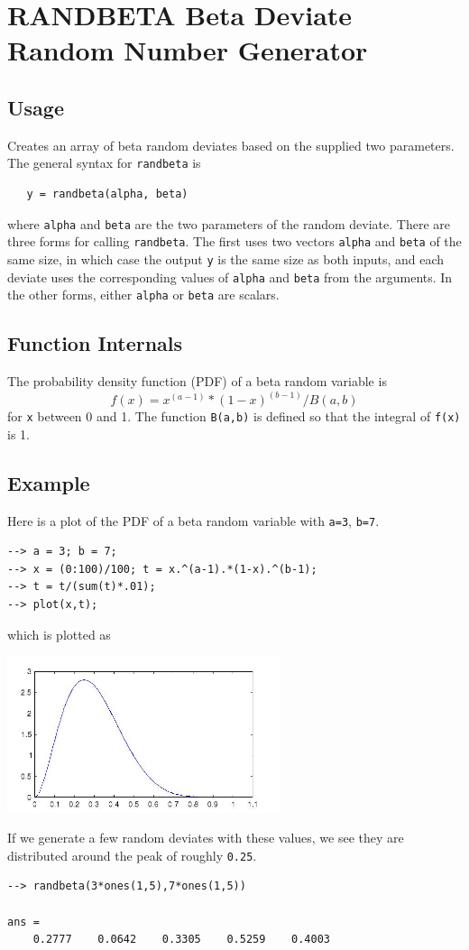 \section{RANDBETA Beta Deviate Random Number Generator}

\subsection{Usage}

Creates an array of beta random deviates based on the supplied
two parameters. The general syntax for \verb|randbeta| is 
\begin{verbatim}
   y = randbeta(alpha, beta)
\end{verbatim}
where \verb|alpha| and \verb|beta| are the two parameters of the 
random deviate.  There are three forms for calling \verb|randbeta|.
The first uses two vectors \verb|alpha| and \verb|beta| of the same
size, in which case the output \verb|y| is the same size as both
inputs, and each deviate uses the corresponding values of \verb|alpha|
and \verb|beta| from the arguments.  In the other forms, either
\verb|alpha| or \verb|beta| are scalars.
\subsection{Function Internals}

The probability density function (PDF) of a beta random variable
is
\[
f(x) = x^(a-1) * (1-x)^(b-1) / B(a,b)
\]
for \verb|x| between 0 and 1.  The function \verb|B(a,b)| is defined so
that the integral of \verb|f(x)| is 1.
\subsection{Example}

Here is a plot of the PDF of a beta random variable with \verb|a=3|,
\verb|b=7|.
\begin{verbatim}
--> a = 3; b = 7;
--> x = (0:100)/100; t = x.^(a-1).*(1-x).^(b-1); 
--> t = t/(sum(t)*.01);
--> plot(x,t);
\end{verbatim}
which is plotted as


\centerline{\includegraphics[width=8cm]{betapdf}}

If we generate a few random deviates with these values,
we see they are distributed around the peak of roughly
\verb|0.25|.
\begin{verbatim}
--> randbeta(3*ones(1,5),7*ones(1,5))

ans = 
    0.2777    0.0642    0.3305    0.5259    0.4003 
\end{verbatim}
